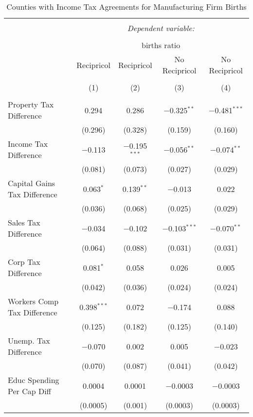 
\begin{table}[!htbp] \centering 
  \caption{Counties with Income Tax Agreements for  Manufacturing Firm Births} 
  \label{31-33rd} 
\begin{tabular}{@{\extracolsep{5pt}}lcccc} 
\\[-1.8ex]\hline 
\hline \\[-1.8ex] 
 & \multicolumn{4}{c}{\textit{Dependent variable:}} \\ 
\cline{2-5} 
\\[-1.8ex] & \multicolumn{4}{c}{births ratio} \\ 
 & Recipricol & Recipricol & No Recipricol & No Recipricol \\ 
\\[-1.8ex] & (1) & (2) & (3) & (4)\\ 
\hline \\[-1.8ex] 
 Property Tax Difference & 0.294 & 0.286 & $-$0.325$^{**}$ & $-$0.481$^{***}$ \\ 
  & (0.296) & (0.328) & (0.159) & (0.160) \\ 
  Income Tax Difference & $-$0.113 & $-$0.195$^{***}$ & $-$0.056$^{**}$ & $-$0.074$^{**}$ \\ 
  & (0.081) & (0.073) & (0.027) & (0.029) \\ 
  Capital Gains Tax Difference & 0.063$^{*}$ & 0.139$^{**}$ & $-$0.013 & 0.022 \\ 
  & (0.036) & (0.068) & (0.025) & (0.029) \\ 
  Sales Tax Difference & $-$0.034 & $-$0.102 & $-$0.103$^{***}$ & $-$0.070$^{**}$ \\ 
  & (0.064) & (0.088) & (0.031) & (0.031) \\ 
  Corp Tax Difference & 0.081$^{*}$ & 0.058 & 0.026 & 0.005 \\ 
  & (0.042) & (0.036) & (0.024) & (0.024) \\ 
  Workers Comp Tax Difference & 0.398$^{***}$ & 0.072 & $-$0.174 & 0.088 \\ 
  & (0.125) & (0.182) & (0.125) & (0.140) \\ 
  Unemp. Tax Difference & $-$0.070 & 0.002 & 0.005 & $-$0.023 \\ 
  & (0.070) & (0.087) & (0.041) & (0.042) \\ 
  Educ Spending Per Cap Diff & 0.0004 & 0.0001 & $-$0.0003 & $-$0.0003 \\ 
  & (0.0005) & (0.001) & (0.0003) & (0.0003) \\ 

\end{tabular}
\end{table}
